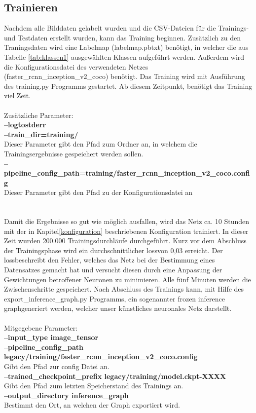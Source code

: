 \documentclass[a4paper,12pt,oneside]{article}
\begin{document}
  
  \subsection{Trainieren}
Nachdem alle Bilddaten gelabelt wurden und die CSV-Dateien für die Trainings- und Testdaten erstellt wurden, kann das Training beginnen. Zusätzlich zu den Traningsdaten wird eine Labelmap (labelmap.pbtxt) benötigt, in welcher die aus Tabelle \ref{tab:klassen1} ausgewählten Klassen aufgeführt werden. Außerdem wird die Konfigurationsdatei des verwendeten Netzes (faster\_rcnn\_inception\_v2\_coco) benötigt. Das Training wird mit Ausführung des training.py Programms gestartet. Ab diesem Zeitpunkt, benötigt das Training viel Zeit.\\\\
Zusätzliche Parameter: \\
\textbf{--logtostderr}\\
\textbf{--train\_dir=training/}\\
Dieser Parameter gibt den Pfad zum Ordner an, in welchem die Trainingsergebnisse gespeichert werden sollen.\\
\textbf{--pipeline\_config\_path=training/faster\_rcnn\_inception\_v2\_coco.config}\\
Dieser Parameter gibt den Pfad zu der Konfigurationsdatei an\\\\
\\
Damit die Ergebnisse so gut wie möglich ausfallen, wird das Netz ca. 10 Stunden mit der in Kapitel\ref{konfiguration} beschriebenen Konfiguration trainiert. In dieser Zeit wurden 200.000 Trainingsdurchläufe durchgeführt. Kurz vor dem Abschluss der Trainingsphase wird ein durchschnittlicher \glqq loss\grqq von 0,03 erreicht. Der \glqq loss\grqq beschreibt den Fehler, welches das Netz bei der Bestimmung eines Datensatzes gemacht hat und versucht diesen durch eine Anpassung der Gewichtungen betroffener Neuronen zu minimieren. Alle fünf Minuten werden die Zwischenschritte gespeichert. Nach Abschluss des Trainings kann, mit Hilfe des export\_inference\_graph.py Programms, ein sogenannter \glqq frozen inference graph\grqq generiert werden, welcher unser künstliches neuronales Netz darstellt.\\\\
Mitgegebene Parameter:\\
\textbf{--input\_type image\_tensor}\\
\textbf{--pipeline\_config\_path legacy/training/faster\_rcnn\_inception\_v2\_coco.config}\\
Gibt den Pfad zur config Datei an.\\
\textbf{--trained\_checkpoint\_prefix legacy/training/model.ckpt-XXXX}\\
Gibt den Pfad zum letzten Speicherstand des Trainings an.\\
\textbf{--output\_directory inference\_graph}\\
Bestimmt den Ort, an welchen der Graph exportiert wird.\\\\
\end{document}
